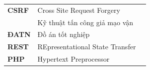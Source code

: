 \documentclass{article}
\begin{document}
\begin{table}[H]
\begin{tabular}{p{} l p{}}
        \fontsize{13pt}{0pt}\selectfont \bfseries CSRF&\fontsize{13pt}{0pt}\selectfont Cross Site Request Forgery
        \vspace{6pt}\\
        &\fontsize{13pt}{0pt}\selectfont Kỹ thuật tấn công giả mạo vận\vspace{8pt}\\
        \fontsize{13pt}{0pt}\selectfont \bfseries ĐATN&\fontsize{13pt}{0pt}\selectfont Đồ án tốt nghiệp\vspace{8pt}\\
        \fontsize{13pt}{0pt}\selectfont \bfseries REST&\fontsize{13pt}{0pt}\selectfont REpresentational State Transfer\vspace{8pt}\\
        \fontsize{13pt}{0pt}\selectfont \bfseries PHP&\fontsize{13pt}{0pt}\selectfont Hypertext Preprocessor\vspace{8pt}\\
    \end{tabular}
\end{table}
\cleardoublepage
\end{document}
